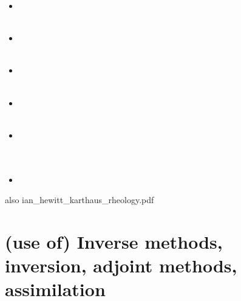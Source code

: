 \begin{scriptsize}
\begin{itemize}
\textcite{moad14} \cite{moad14}\\
\item[\twothousandfifteen] 
\textcite{issg15} \cite{issg15}\\
\textcite{frlg15} \cite{frlg15}\\
\item[\twothousandsixteen] 
\textcite{krab16} \cite{krab16}\\
\textcite{daws16} \cite{daws16}\\
\item[\twothousandseventeen] 
\textcite{lolc17} \cite{lolc17}\\
\textcite{gors17} \cite{gors17}\\
\item[\twothousandeighteen] 
\textcite{heah18} \cite{heah18}\\
\textcite{mimr18} \cite{mimr18}\\
\item[\twothousandnineteen] 
\textcite{kudd19} \cite{kudd19}\\
\textcite{kuwd19} \cite{kuwd19}\\
\textcite{kuiper19} \cite{kuiper19}\\
\item[\twothousandtwentyone] 
\textcite{begv21} \cite{begv21}\\
\end{itemize}
\end{scriptsize}


also ian\_hewitt\_karthaus\_rheology.pdf

\section{(use of) Inverse methods, inversion, adjoint methods, assimilation}


